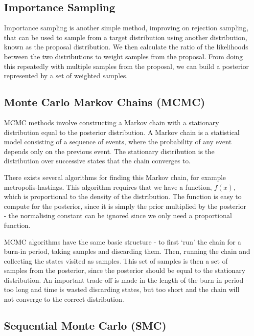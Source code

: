 \subsection{Importance Sampling}
	
Importance sampling is another simple method, improving on rejection sampling, that can be used to sample from a target distribution using another distribution, known as the proposal distribution. We then calculate the ratio of the likelihoods between the two distributions to weight samples from the proposal. From doing this repeatedly with multiple samples from the proposal, we can build a posterior represented by a set of weighted samples.
	
	
\subsection{Monte Carlo Markov Chains (MCMC)}
	
MCMC methods involve constructing a Markov chain with a stationary distribution equal to the posterior distribution. A Markov chain is a statistical model consisting of a sequence of events, where the probability of any event depends only on the previous event. The stationary distribution is the distribution over successive states that the chain converges to.
	
There exists several algorithms for finding this Markov chain, for example metropolis-hastings. This algorithm requires that we have a function, $f(x)$, which is proportional to the density of the distribution. The function is easy to compute for the posterior, since it is simply the prior multiplied by the posterior - the normalising constant can be ignored since we only need a proportional function.
	
MCMC algorithms have the same basic structure - to first `run' the chain for a burn-in period, taking samples and discarding them. Then, running the chain and collecting the states visited as samples. This set of samples is then a set of samples from the posterior, since the posterior should be equal to the stationary distribution. An important trade-off is made in the length of the burn-in period - too long and time is wasted discarding states, but too short and the chain will not converge to the correct distribution.
	
\subsection{Sequential Monte Carlo (SMC)}
	
